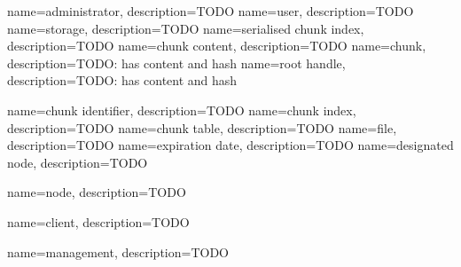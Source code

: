 {
	name={administrator},
	description={TODO}
}
{
	name={user},
	description={TODO}
}
{
	name={storage},
	description={TODO}
}
{
	name={serialised chunk index},
	description={TODO}
}
{
	name={chunk content},
	description={TODO}
}
{
	name={chunk},
	description={TODO: has content and hash}
}
{
	name={root handle},
	description={TODO: has content and hash}
}

{
	name={chunk identifier},
	description={TODO}
}
{
	name={chunk index},
	description={TODO}
}
{
	name={chunk table},
	description={TODO}
}
{
	name={file},
	description={TODO}
}
{
	name={expiration date},
	description={TODO}
}
{
	name={designated node},
	description={TODO}
}

{
	name={node},
	description={TODO}
}

{
	name={client},
	description={TODO}
}

{
	name={management},
	description={TODO}
}

